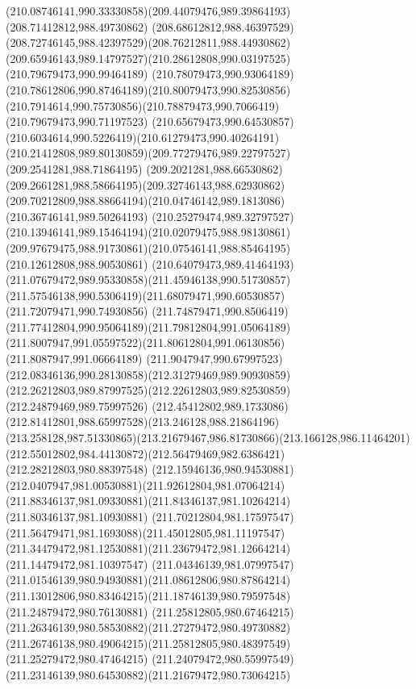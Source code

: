 {{	\curveto(210.08746141,990.33330858)(209.44079476,989.39864193)(208.71412812,988.49730862)
	\curveto(208.68612812,988.46397529)(208.72746145,988.42397529)(208.76212811,988.44930862)
	\curveto(209.65946143,989.14797527)(210.28612808,990.03197525)(210.79679473,990.99464189)
	\curveto(210.78079473,990.93064189)(210.78612806,990.87464189)(210.80079473,990.82530856)
	\curveto(210.7914614,990.75730856)(210.78879473,990.7066419)(210.79679473,990.71197523)
	\curveto(210.65679473,990.64530857)(210.6034614,990.5226419)(210.61279473,990.40264191)
	\curveto(210.21412808,989.80130859)(209.77279476,989.22797527)(209.2541281,988.71864195)
	\curveto(209.2021281,988.66530862)(209.2661281,988.58664195)(209.32746143,988.62930862)
	\curveto(209.70212809,988.88664194)(210.04746142,989.1813086)(210.36746141,989.50264193)
	\curveto(210.25279474,989.32797527)(210.13946141,989.15464194)(210.02079475,988.98130861)
	\curveto(209.97679475,988.91730861)(210.07546141,988.85464195)(210.12612808,988.90530861)
	\curveto(210.64079473,989.41464193)(211.07679472,989.95330858)(211.45946138,990.51730857)
	\curveto(211.57546138,990.5306419)(211.68079471,990.60530857)(211.72079471,990.74930856)
	\curveto(211.74879471,990.8506419)(211.77412804,990.95064189)(211.79812804,991.05064189)
	\curveto(211.8007947,991.05597522)(211.80612804,991.06130856)(211.8087947,991.06664189)
	\curveto(211.9047947,990.67997523)(212.08346136,990.28130858)(212.31279469,989.90930859)
	\curveto(212.26212803,989.87997525)(212.22612803,989.82530859)(212.24879469,989.75997526)
	\curveto(212.45412802,989.1733086)(212.81412801,988.65997528)(213.246128,988.21864196)
	\curveto(213.258128,987.51330865)(213.21679467,986.81730866)(213.166128,986.11464201)
	\curveto(212.55012802,984.44130872)(212.56479469,982.6386421)(212.28212803,980.88397548)
	\curveto(212.15946136,980.94530881)(212.0407947,981.00530881)(211.92612804,981.07064214)
	\curveto(211.88346137,981.09330881)(211.84346137,981.10264214)(211.80346137,981.10930881)
	\curveto(211.70212804,981.17597547)(211.56479471,981.1693088)(211.45012805,981.11197547)
	\curveto(211.34479472,981.12530881)(211.23679472,981.12664214)(211.14479472,981.10397547)
	\curveto(211.04346139,981.07997547)(211.01546139,980.94930881)(211.08612806,980.87864214)
	\curveto(211.13012806,980.83464215)(211.18746139,980.79597548)(211.24879472,980.76130881)
	\curveto(211.25812805,980.67464215)(211.26346139,980.58530882)(211.27279472,980.49730882)
	\curveto(211.26746138,980.49064215)(211.25812805,980.48397549)(211.25279472,980.47464215)
	\curveto(211.24079472,980.55997549)(211.23146139,980.64530882)(211.21679472,980.73064215)
}}
